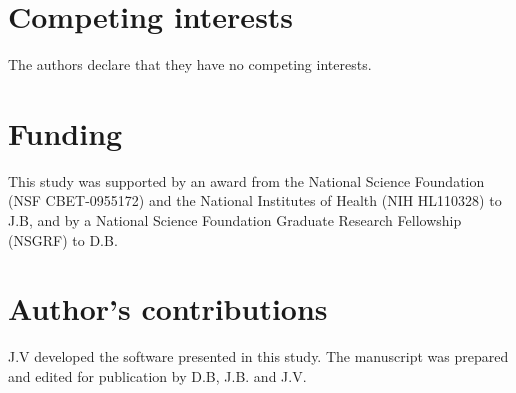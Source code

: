 \documentclass{bmcart}
\begin{document}
\begin{backmatter}

\section*{Competing interests}
  The authors declare that they have no competing interests.

\section*{Funding}
This study was supported by an award from the National Science Foundation (NSF CBET-0955172) and the National Institutes of Health (NIH HL110328) to J.B, and by
a National Science Foundation Graduate Research Fellowship (NSGRF) to D.B.

\section*{Author's contributions}
    J.V developed the software presented in this study. The manuscript was prepared and edited for publication by D.B, J.B. and J.V.




\end{backmatter}
\end{document}
